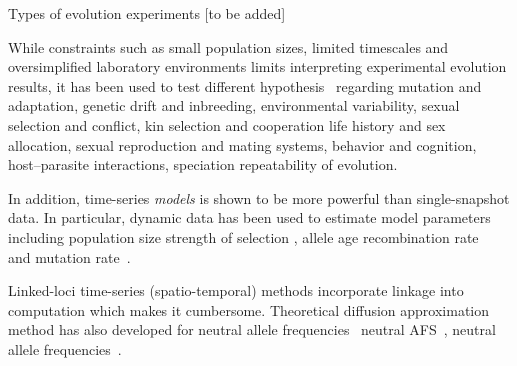 \documentclass[11pt]{article}
\begin{document}
Types of evolution experiments \cite{Barrick2013Genome} [to be added]

While constraints such as small population sizes, limited timescales and 
oversimplified  laboratory
 environments limits interpreting experimental evolution results, it has
  been used to test different hypothesis~\cite{kawecki2012experimental}
   regarding
mutation and adaptation, 
genetic drift and inbreeding, 
environmental variability,
sexual selection and conflict, 
kin selection and cooperation
life history and sex allocation, 
sexual reproduction and mating systems, 
behavior and cognition, 
host–parasite interactions, 
speciation
repeatability of evolution.

In addition, time-series \emph{models} is shown to be more powerful 
\cite{boyko2008assessing,desai2008polymorphism,sawyer1992population} 
than single-snapshot data.
In particular, dynamic data has been used to estimate model parameters 
including population size
\cite{williamson1999using,wang2001pseudo,pollak1983new,waples1989generalized,
	Terhorst2015Multi}
strength of selection
\cite{mathieson2013estimating,illingworth2011distinguishing,Terhorst2015Multi,
	bollback2008estimation,illingworth2012quantifying,malaspinas2012estimating,
	Steinrücken2014a, malaspinas2012estimating}, allele age
 \cite{malaspinas2012estimating}
recombination rate~\cite{Terhorst2015Multi}  and mutation
 rate~\cite{Barrick2013Genome, Terhorst2015Multi}. 

Linked-loci time-series (spatio-temporal) methods 
\cite{illingworth2011distinguishing,illingworth2012quantifying,
	Barrick2013Genome,Terhorst2015Multi} incorporate linkage into computation
 which makes it cumbersome. Theoretical diffusion approximation method has also 
 developed for neutral allele frequencies~\cite{Ewens2012Mathematical, 
 kimura1955solution}
neutral AFS~\cite{evans2007non}, neutral allele
 frequencies~\cite{song2012simple}.
\end{document}
